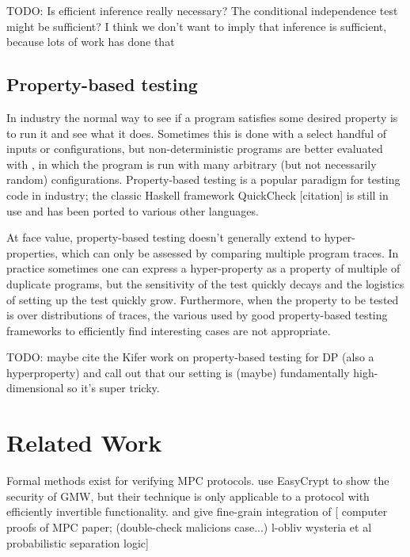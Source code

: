 \documentclass[conference]{IEEEtran}
\begin{document}
TODO: Is efficient inference really necessary? The conditional independence test might be sufficient? I think we don't want to imply that inference is sufficient, because lots of work has done that

\subsection{Property-based testing}

In industry the normal way to see if a program satisfies some desired property is to run it and see what it does.
Sometimes this is done with a select handful of inputs or configurations,
but non-deterministic programs are better evaluated with ,
in which the program is run with many arbitrary (but not necessarily random) configurations.
Property-based testing is a popular paradigm for testing code in industry;
the classic Haskell framework QuickCheck [citation] %
is still in use and has been ported to various other languages.

At face value, property-based testing doesn't generally extend to hyper-properties,
which can only be assessed by comparing multiple program traces.
In practice sometimes one can express a hyper-property as a property of multiple of duplicate programs,
but the sensitivity of the test quickly decays and the logistics of setting up the test quickly grow.
Furthermore, when the property to be tested is over distributions of traces,
the various used by good property-based testing frameworks to efficiently find interesting cases are not appropriate.

TODO: maybe cite the Kifer work on property-based testing for DP (also a hyperproperty) and call out that our setting is (maybe) fundamentally high-dimensional so it's super tricky.

\section{Related Work}

Formal methods exist for verifying MPC protocols.
\cite{https://arxiv.org/pdf/1806.07197.pdf} %
use EasyCrypt to show the security of GMW,
but their technique is only applicable to a protocol with efficiently invertible functionality. 
and
\cite{Wysteria} %
give fine-grain integration of 
[ computer proofs of MPC paper; (double-check malicions case...)
  l-obliv
  wysteria et al
  probabilistic separation logic]
\end{document}
